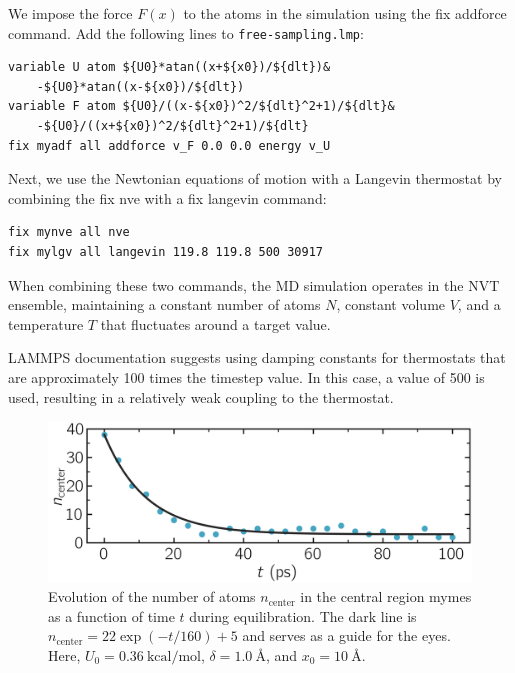 \documentclass[9pt,tutorial]{livecoms}
\newcommand{\lmpcmd}[1]{\colorbox{listing}{\textcolor{command}{\small{#1}}}} %
\newcommand{\flecmd}[1]{\textcolor{command}{\texttt{#1}}} %
\begin{document}
We impose the force $F(x)$ to the atoms in the simulation
using the \lmpcmd{fix addforce} command.  Add the following
lines to \flecmd{free-sampling.lmp}:
\begin{lstlisting}
variable U atom ${U0}*atan((x+${x0})/${dlt})&
    -${U0}*atan((x-${x0})/${dlt})
variable F atom ${U0}/((x-${x0})^2/${dlt}^2+1)/${dlt}&
    -${U0}/((x+${x0})^2/${dlt}^2+1)/${dlt}
fix myadf all addforce v_F 0.0 0.0 energy v_U
\end{lstlisting}
Next, we use the Newtonian equations of motion with a
Langevin thermostat by combining the \lmpcmd{fix nve} with a
\lmpcmd{fix langevin} command:
\begin{lstlisting}
fix mynve all nve
fix mylgv all langevin 119.8 119.8 500 30917
\end{lstlisting}
When combining these two commands, the MD simulation operates
in the NVT ensemble, maintaining a constant number of
atoms $N$, constant volume $V$, and a temperature $T$ that
fluctuates around a target value.

\begin{note}
  LAMMPS documentation suggests using damping constants for thermostats 
  that are approximately 100 times the timestep value.  In this case, a value of 500 
  is used, resulting in a relatively weak coupling to the thermostat.
\end{note}

\begin{figure}
\centering
\includegraphics[width=\linewidth]{US-density-evolution}
\caption{Evolution of the number of atoms $n_\text{center}$ in the central
region \lmpcmd{mymes} as a function of time $t$ during equilibration.  The dark line
is $n_\text{center} = 22 \exp(-t/160)+5$ and serves as a guide for the eyes.
Here, $U_0 = 0.36~\text{kcal/mol}$, $\delta = 1.0~\text{\AA{}}$, and $x_0 = 10~\text{\AA{}}$.}
\label{fig:US-density-evolution}
\end{figure}
\end{document}
